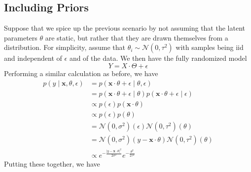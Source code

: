 \documentclass[12pt]{article}
\newcommand{\x}{\mathbf{x}}
\newcommand{\norm}{\mathcal{N}}
\begin{document}
\subsection{Including Priors}
Suppose that we spice up the previous scenario by not assuming that the latent parameters $\theta$ are static, but rather that they are drawn themselves from a distribution. For simplicity, assume that $\theta_i \sim \norm(0, \tau^ 2)$ with samples being iid and independent of $\epsilon$ and of the data. We then have the fully randomized model 
\[ Y = X \cdot \Theta + \epsilon \]
Performing a similar calculation as before, we have 
\begin{align*}
p(y \mid \x, \theta, \epsilon) &= p( \x \cdot \theta + \epsilon \mid \theta, \epsilon)\\
& = p( \x \cdot \theta + \epsilon \mid \theta) p( \x \cdot \theta + \epsilon \mid \epsilon)\\
  &\propto p(\epsilon)p (\x \cdot \theta)\\
  &\propto p(\epsilon)p (\theta) \\
  &=\norm(0, \sigma^2)(\epsilon)\norm(0, \tau^2)(\theta)\\
  &=\norm(0, \sigma^2)(y-\x \cdot \theta)\norm(0, \tau^2)(\theta)\\
  &\propto e^{-\frac{|y - \x \cdot \theta|^2}{2\sigma^2}}e^{-\frac{\theta^2}{2\tau^2}}
\end{align*}
Putting these together, we have 
\end{document}
